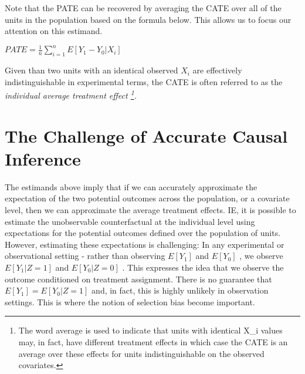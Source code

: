 \documentclass[../main.tex]{subfiles}
\begin{document}
\vspace{\baselineskip}
Note that the PATE can be recovered by averaging the CATE over all of the units in the population based on the formula below. This allows us to focus our attention on this estimand.\par


\vspace{\baselineskip}
\begin{adjustwidth}{0.5in}{0.0in}
 \( PATE = \frac{1}{n} \sum _{i=1}^{n}E \left[ Y_{1} - Y_{0}  \vert  X_{i} \right]  \) \par

\end{adjustwidth}


\vspace{\baselineskip}
Given than two units with an identical observed  \( X_{i} \) are effectively indistinguishable in experimental terms, the CATE is often referred to as the \textit{individual average treatment effect \footnote{ The word average is used to indicate that units with identical X\_i values may, in fact, have different treatment effects in which case the CATE is an average over these effects for units indistinguishable on the observed covariates. }.}\par

\section{The Challenge of Accurate Causal Inference}

\vspace{\baselineskip}
The estimands above imply that if we can accurately approximate the expectation of the two potential outcomes across the population, or a covariate level, then we can approximate the average treatment effects. IE, it is possible to estimate the unobservable counterfactual at the individual level using expectations for the potential outcomes defined over the population of units. However, estimating these expectations is challenging: In any experimental or observational setting - rather than observing  \( E \left[ Y_{1} \right]  \)  and  \( E \left[ Y_{0} \right]  \) , we observe  \( E \left[ Y_{1}  \vert  Z=1 \right]   \) and  \( E \left[ Y_{0}  \vert  Z= 0 \right]  \) . This expresses the idea that we observe the outcome conditioned on treatment assignment. There is no guarantee that  \( E \left[ Y_{1} \right]  = E \left[ Y_{0}  \vert  Z=1 \right]  \)  and, in fact, this is highly unlikely in observation settings. This is where the notion of selection bias become important.\par
\end{document}

